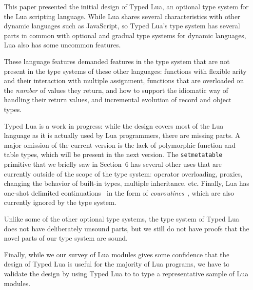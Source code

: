 \documentclass[preprint]{sig-alternate}
\begin{document}
This paper presented the initial design of Typed Lua,
an optional type system for the Lua scripting language.
While Lua shares several characteristics with other
dynamic languages such as JavaScript, so Typed Lua's
type system has several parts in common with optional
and gradual type systems for dynamic languages,
Lua also has some uncommon features. 

These language features demanded features in the type
system that are not present in the type systems of these
other languages: functions with flexible arity and
their interaction with multiple assignment, functions
that are overloaded on the {\em number} of values
they return, and how to support the idiomatic way of
handling their return values, and incremental evolution
of record and object types.

Typed Lua is a work in progress: while the design covers
most of the Lua language as it is actually used by Lua
programmers, there are missing parts. A major omission
of the current version is the lack of polymorphic function
and table types, which will be present in the next version.
The {\tt setmetatable} primitive that we briefly saw in
Section~6 has several other uses that are currently
outside of the scope of the type system: operator
overloading, proxies, changing the behavior of built-in
types, multiple inheritance, etc. Finally, Lua has
one-shot delimited continuations~\citep{james2011yield}
in the form of {\em couroutines}~\citep{moura:coro},
which are also currently ignored by the type system.

Unlike some of the other optional type systems,
the type system of Typed Lua does not have deliberately
unsound parts, but we still do not have proofs that the
novel parts of our type system are sound.

Finally, while we our survey of Lua modules gives some
confidence that the design of Typed Lua is useful for
the majority of Lua programs, we have to validate the
design by using Typed Lua to to type a representative 
sample of Lua modules.



\end{document}
